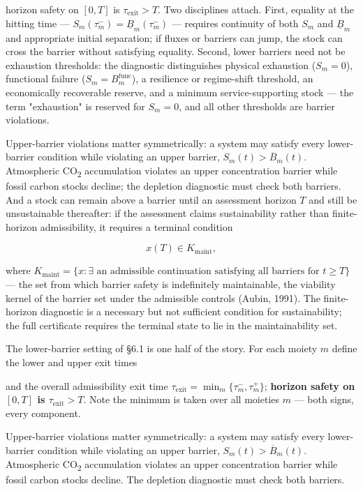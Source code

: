 \documentclass[11pt]{article}
\begin{document}
 horizon safety on \([0,T]\) is \(\tau_{\mathrm{exit}} > T\). Two disciplines attach. First, equality at the hitting time --- \(S_m(\tau_m^-) =\allowbreak{} \underline{B}_m(\tau_m^-)\) --- requires continuity of both \(S_m\) and \(\underline{B}_m\) and appropriate initial separation; if fluxes or barriers can jump, the stock can cross the barrier without satisfying equality. Second, lower barriers need not be exhaustion thresholds: the diagnostic distinguishes physical exhaustion (\(S_m = 0\)), functional failure (\(S_m = B_m^{\mathrm{func}}\)), a resilience or regime-shift threshold, an economically recoverable reserve, and a minimum service-supporting stock --- the term "exhaustion" is reserved for \(S_m = 0\), and all other thresholds are barrier violations.

Upper-barrier violations matter symmetrically: a system may satisfy every lower-barrier condition while violating an upper barrier, \(S_m(t) > \overline{B}_m(t)\). Atmospheric CO\textsubscript{2} accumulation violates an upper concentration barrier while fossil carbon stocks decline; the depletion diagnostic must check both barriers. And a stock can remain above a barrier until an assessment horizon \(T\) and still be unsustainable thereafter: if the assessment claims sustainability rather than finite-horizon admissibility, it requires a terminal condition 

$$x(T) \in K_{\mathrm{maint}},$$

 where \(K_{\mathrm{maint}} =\allowbreak{} \{ x : \exists \text{ an admissible continuation satisfying all barriers for } t \ge T \}\) --- the set from which barrier safety is indefinitely maintainable, the viability kernel of the barrier set under the admissible controls (Aubin, 1991). The finite-horizon diagnostic is a necessary but not sufficient condition for sustainability; the full certificate requires the terminal state to lie in the maintainability set.

The lower-barrier setting of \S6.1 is one half of the story. For each moiety \(m\) define the lower and upper exit times

and the overall admissibility exit time \(\tau_{\mathrm{exit}}=\allowbreak{}\min_m\{\tau_m^-,\allowbreak{}\tau_m^+\allowbreak{}\}\); \textbf{horizon safety on \([0,T]\) is \(\tau_{\mathrm{exit}}>T\)}. Note the minimum is taken over all moieties \(m\) --- both signs, every component.

Upper-barrier violations matter symmetrically: a system may satisfy every lower-barrier condition while violating an upper barrier, \(S_m(t)>\overline B_m(t)\). Atmospheric CO\textsubscript{2} accumulation violates an upper concentration barrier while fossil carbon stocks decline. The depletion diagnostic must check both barriers.
\end{document}
